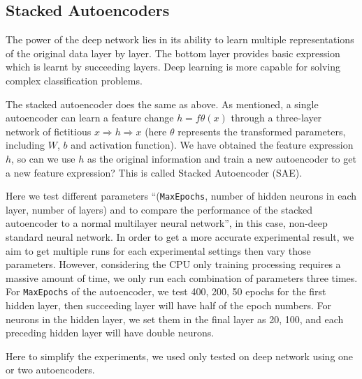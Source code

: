 \documentclass{article}
\begin{document}
\subsection{Stacked Autoencoders}
The power of the deep network lies in its ability to learn multiple representations of the original data layer by layer. The bottom layer provides basic expression which is learnt by succeeding layers. Deep learning is more capable for solving complex classification problems.

The stacked autoencoder does the same as above. As mentioned, a single autoencoder can learn a feature change $h = f\theta(x)$ through a three-layer network of fictitious $x\Rightarrow h\Rightarrow x$ (here $\theta$ represents the transformed parameters, including $W$, $b$ and activation function). We have obtained the feature expression $h$, so can we use $h$ as the original information and train a new autoencoder to get a new feature expression? This is called Stacked Autoencoder (SAE).

Here we test different parameters ``(\verb|MaxEpochs|, number of hidden neurons in each layer, number of layers) and to compare the performance of the stacked autoencoder to a normal multilayer
neural network'', in this case, non-deep standard neural network. In order to get a more accurate experimental result, we aim to get multiple runs for each experimental settings then vary those parameters. However, considering the CPU only training processing requires a massive amount of time, we only run each combination of parameters three times. For \verb|MaxEpochs| of the autoencoder, we test {400, 200, 50} epochs for the first hidden layer, then succeeding layer will have half of the epoch numbers. For neurons in the hidden layer, we set them in the final layer as {20, 100}, and each preceding hidden layer will have double neurons. 

Here to simplify the experiments, we used only tested on deep network using one or two autoencoders. 
\end{document}
